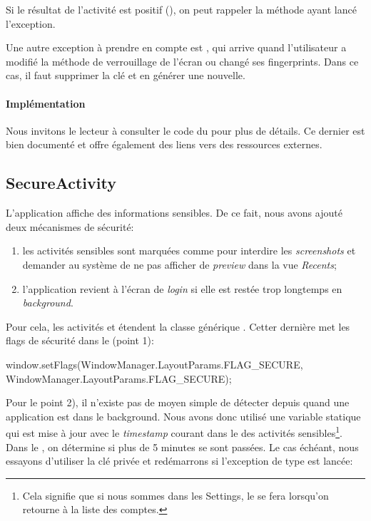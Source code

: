 Si le résultat de l'activité est positif (), on peut rappeler la méthode ayant lancé l'exception.

Une autre exception à prendre en compte est , qui arrive quand l'utilisateur a modifié la méthode de verrouillage de l'écran ou changé ses fingerprints. Dans ce cas, il faut supprimer la clé et en générer une nouvelle.

\paragraph*{Implémentation} Nous invitons le lecteur à consulter le code du  pour plus de détails. Ce dernier est bien documenté et offre également des liens vers des ressources externes.

\subsection{SecureActivity}

L'application affiche des informations sensibles. De ce fait, nous avons ajouté deux mécanismes de sécurité:
\begin{enumerate}
    \item les activités sensibles sont marquées comme  pour interdire les \emph{screenshots} et demander au système de ne pas afficher de \emph{preview} dans la vue \emph{Recents};
    \item l'application revient à l'écran de \emph{login} si elle est restée trop longtemps en \emph{background}.
\end{enumerate}


Pour cela, les activités  et  étendent la classe générique . Cetter dernière met les flags de sécurité dans le  (point 1):

\begin{kotlincode}
window.setFlags(WindowManager.LayoutParams.FLAG_SECURE,
    WindowManager.LayoutParams.FLAG_SECURE);
\end{kotlincode}

Pour le point 2), il n'existe pas de moyen simple de détecter depuis quand une application est dans le background. Nous avons donc utilisé une variable statique qui est mise à jour avec le \emph{timestamp} courant dans le  des activités sensibles\footnote{Cela signifie que si nous sommes dans les Settings, le  se fera lorsqu'on retourne à la liste des comptes.}. Dans le , on détermine si plus de 5 minutes se sont passées. Le cas échéant, nous essayons d'utiliser la clé privée et redémarrons si l'exception de type  est lancée:

